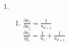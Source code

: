 \documentclass[paper=a4, fontsize=11pt]{scrartcl}
\begin{document}
\begin{enumerate}[1.]
  \item
    \begin{enumerate}[1]
      \item
      	$\frac{\partial x_i}{\partial u_j} = \frac{1}{u_{d+1}}$	\\
      	$\frac{\partial x_i}{\partial j_i} = \frac{1}{u_i} + \frac{1}{u_{d+1}}$
    \end{enumerate}
\end{enumerate}
\end{document}
